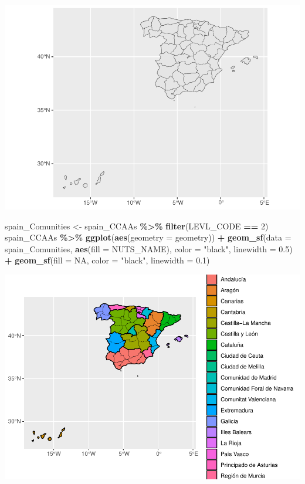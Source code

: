 \documentclass[data,article,submit,moreauthors,pdftex]{Definitions/mdpi}
\newenvironment{Shaded}{\begin{snugshade}}{\end{snugshade}}
\newcommand{\AttributeTok}[1]{\textcolor[rgb]{0.13,0.29,0.53}{#1}}
\newcommand{\ConstantTok}[1]{\textcolor[rgb]{0.56,0.35,0.01}{#1}}
\newcommand{\DecValTok}[1]{\textcolor[rgb]{0.00,0.00,0.81}{#1}}
\newcommand{\FloatTok}[1]{\textcolor[rgb]{0.00,0.00,0.81}{#1}}
\newcommand{\FunctionTok}[1]{\textcolor[rgb]{0.13,0.29,0.53}{\textbf{#1}}}
\newcommand{\NormalTok}[1]{#1}
\newcommand{\OtherTok}[1]{\textcolor[rgb]{0.56,0.35,0.01}{#1}}
\newcommand{\SpecialCharTok}[1]{\textcolor[rgb]{0.81,0.36,0.00}{\textbf{#1}}}
\newcommand{\StringTok}[1]{\textcolor[rgb]{0.31,0.60,0.02}{#1}}
\begin{document}
\includegraphics{ProyectoAED2024_Rmd_files/figure-latex/unnamed-chunk-29-1.pdf}

\begin{Shaded}
\begin{Highlighting}[]
\NormalTok{spain\_Comunities }\OtherTok{\textless{}{-}}\NormalTok{ spain\_CCAAs }\SpecialCharTok{\%\textgreater{}\%}
    \FunctionTok{filter}\NormalTok{(LEVL\_CODE }\SpecialCharTok{==} \DecValTok{2}\NormalTok{)}
\NormalTok{spain\_CCAAs }\SpecialCharTok{\%\textgreater{}\%}
    \FunctionTok{ggplot}\NormalTok{(}\FunctionTok{aes}\NormalTok{(}\AttributeTok{geometry =}\NormalTok{ geometry)) }\SpecialCharTok{+} \FunctionTok{geom\_sf}\NormalTok{(}\AttributeTok{data =}\NormalTok{ spain\_Comunities,}
    \FunctionTok{aes}\NormalTok{(}\AttributeTok{fill =}\NormalTok{ NUTS\_NAME), }\AttributeTok{color =} \StringTok{"black"}\NormalTok{, }\AttributeTok{linewidth =} \FloatTok{0.5}\NormalTok{) }\SpecialCharTok{+}
    \FunctionTok{geom\_sf}\NormalTok{(}\AttributeTok{fill =} \ConstantTok{NA}\NormalTok{, }\AttributeTok{color =} \StringTok{"black"}\NormalTok{, }\AttributeTok{linewidth =} \FloatTok{0.1}\NormalTok{)}
\end{Highlighting}
\end{Shaded}

\includegraphics{ProyectoAED2024_Rmd_files/figure-latex/unnamed-chunk-29-2.pdf}
\end{document}
